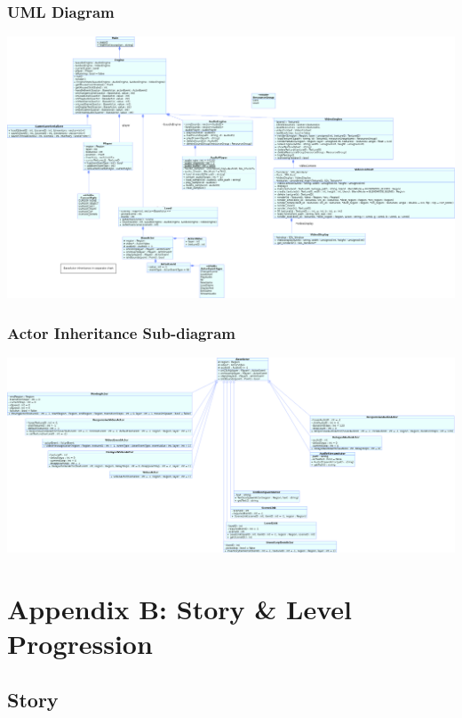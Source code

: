 \documentclass{article}
\begin{document}
		\subsubsection{UML Diagram}
			\begin{center}
				\includegraphics[scale=0.30]{MainClasses}
			\end{center}
		\subsubsection{Actor Inheritance Sub-diagram}
			\begin{center}
				\includegraphics[scale=0.3]{Actors}
			\end{center}
\section{Appendix B: Story \& Level Progression}
	\subsection{Story}
\end{document}
